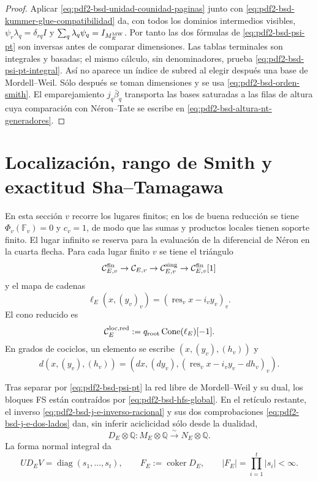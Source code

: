 \begin{proof}
Aplicar \eqref{eq:pdf2-bsd-unidad-counidad-paginas} junto con
\eqref{eq:pdf2-bsd-kummer-glue-compatibilidad} da, con todos los dominios
intermedios visibles,
$\psi_r\lambda_q=\delta_{rq}I$ y
$\sum_q\lambda_q\psi_q=I_{M_E^{\rm MW}}$. Por tanto las dos fórmulas de
\eqref{eq:pdf2-bsd-psi-pt} son inversas antes de comparar dimensiones.
Las tablas terminales son integrales y basadas; el mismo cálculo, sin
denominadores, prueba \eqref{eq:pdf2-bsd-psi-pt-integral}. Así no aparece un
índice de subred al elegir después una base de Mordell--Weil.
Sólo después se toman dimensiones y se usa
\eqref{eq:pdf2-bsd-orden-smith}. El emparejamiento
$j_q\bar\beta_q$ transporta las bases saturadas a las filas de altura cuya
comparación con Néron--Tate se escribe en
\eqref{eq:pdf2-bsd-altura-nt-generadores}.
\end{proof}

\section{Localización, rango de Smith y exactitud Sha--Tamagawa}

En esta sección $v$ recorre los lugares finitos; en los de buena reducción se
tiene $\Phi_v(\mathbb F_v)=0$ y $c_v=1$, de modo que las sumas y productos
locales tienen soporte finito. El lugar infinito se reserva para la evaluación
de la diferencial de Néron en la cuarta flecha. Para cada lugar finito $v$ se
tiene el triángulo
\[
 \mathcal C_{E,v}^{\rm fin}\to\mathcal C_{E,v}\to
 \mathcal C_{E,v}^{\rm sing}\to\mathcal C_{E,v}^{\rm fin}[1]
\]
y el mapa de cadenas
\begin{equation}\label{eq:pdf2-bsd-ell-e}
 \ell_E(x,(y_v)_v)=(\operatorname{res}_vx-i_vy_v)_v.
\end{equation}
El cono reducido es
\begin{equation}\label{eq:pdf2-bsd-cono-reducido}
 \mathcal C_E^{\rm loc,red}:=
 q_{\rm root}\operatorname{Cone}(\ell_E)[-1].
\end{equation}
En grados de cociclos, un elemento se escribe $(x,(y_v),(h_v))$ y
\begin{equation}\label{eq:pdf2-bsd-diferencial-cono}
 d(x,(y_v),(h_v))=
 (dx,(dy_v),(\operatorname{res}_vx-i_vy_v-dh_v)_v).
\end{equation}

Tras separar por \eqref{eq:pdf2-bsd-psi-pt} la red libre de Mordell--Weil
y su dual, los bloques FS están contraídos por
\eqref{eq:pdf2-bsd-hfs-global}. En el retículo restante, el inverso
\eqref{eq:pdf2-bsd-j-e-inverso-racional} y sus dos comprobaciones
\eqref{eq:pdf2-bsd-j-e-dos-lados} dan, sin inferir aciclicidad sólo desde la
dualidad,
\begin{equation}\label{eq:pdf2-bsd-rango-completo}
 D_E\otimes\mathbb Q:M_E\otimes\mathbb Q
 \xrightarrow{\sim}N_E\otimes\mathbb Q.
\end{equation}
La forma normal integral da
\begin{equation}\label{eq:pdf2-bsd-smith-finito}
 UD_EV=\operatorname{diag}(s_1,\ldots,s_t),
 \qquad
 F_E:=\operatorname{coker}D_E,
 \qquad |F_E|=\prod_{i=1}^t|s_i|<\infty.
\end{equation}

